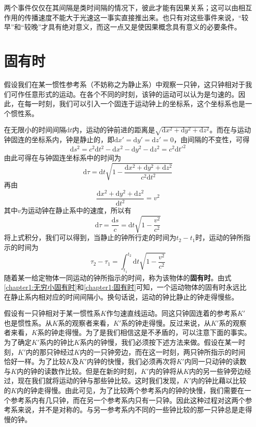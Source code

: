 两个事件仅仅在其间隔是类时间隔的情况下，彼此才能有因果关系；这可以由相互作用的传播速度不能大于光速这一事实直接推出来。也只有对这些事件来说，“较早”和“较晚”才具有绝对意义，而这一点又是使因果概念具有意义的必要条件。

\section{固有时}\label{chapter1:section固有时}

假设我们在某一惯性参考系（不妨称之为静止系）中观察一只钟，这只钟相对于我们可作任意形式的运动。在各个不同的时刻，该钟的运动可以认为是匀速的。因此，在每一时刻，我们可以引入一个固连于运动钟上的坐标系，这个坐标系也是一个惯性系。

在无限小的时间间隔$\mathrm{d}t$内，运动的钟前进的距离是$\sqrt{\mathrm{d}x^2 + \mathrm{d}y^2 + \mathrm{d}z^2}$。而在与运动钟固连的坐标系内，钟是静止的，即$\mathrm{d}x'= \mathrm{d}y' = \mathrm{d}z' = 0$，由间隔的不变性，可得
\begin{equation*}
	\mathrm{d}s^2 = c^2 \mathrm{d}t^2 - \mathrm{d}x^2 - \mathrm{d}y^2 - \mathrm{d}z^2 = c^2 \mathrm{d} t'^2
\end{equation*}
由此可得在与钟固连坐标系中的时间为
\begin{equation}
	\mathrm{d}\tau = \mathrm{d}t \sqrt{1-\frac{\mathrm{d}x^2 + \mathrm{d}y^2 + \mathrm{d}z^2}{c^2 \mathrm{d}t^2}}
	\label{chapter1:无穷小固有时}
\end{equation}
再由
\begin{equation*}
	\frac{\mathrm{d}x^2 + \mathrm{d}y^2 + \mathrm{d}z^2}{\mathrm{d}t^2} = v^2
\end{equation*}
其中$v$为运动钟在静止系中的速度，所以有
\begin{equation}
	\mathrm{d}\tau = \frac{\mathrm{d} s}{c} = \mathrm{d}t\sqrt{1-\frac{v^2}{c^2}}
	\label{chapter1:无穷小固有时}
\end{equation}
将上式积分，我们可以得到，当静止的钟所行走的时间为$t_2-t_1$时，运动的钟所指示的时间为
\begin{equation}
	\tau_2 - \tau_1 = \int_{t_1}^{t_2} \mathrm{d}t\sqrt{1-\frac{v^2}{c^2}}
	\label{chapter1:固有时}
\end{equation}
随着某一给定物体一同运动的钟所指示的时间，称为该物体的{\bf 固有时}。由式\eqref{chapter1:无穷小固有时}和\eqref{chapter1:固有时}可知，一个运动物体的固有时永远比在静止系内相对应的时间间隔小。换句话说，运动的钟比静止的钟走得慢些。

假设有一只钟相对于某一惯性系$K$作匀速直线运动。同这只钟固连着的参考系$K'$也是惯性系。从$K$系的观察者来看，$K'$系的钟走得慢。反过来说，从$K'$系的观察者来看，$K$系的钟走得慢。为了是我们相信这是不矛盾的，可以注意下面的事实。为了确定$K'$系内的钟比$K$系内的钟慢，我们必须按下述方法来做。假设在某一时刻，$K'$内的那只钟经过$K$内的一只钟旁边，而在这一时刻，两只钟所指示的时间恰好一样。为了比较$K$及$K'$内钟的快慢，我们必须再次将$K'$内同一只动钟的读数与$K$内的钟的读数作比较。但是在新的时刻，$K'$内的钟将从$K$内的另一些钟旁边经过，现在我们就将运动的钟与那些钟比较。这时我们发现，$K'$内的钟比藉以比较的$K$内的钟走得慢。由此可见，为了比较两个参考系内的钟的快慢，我们需要在一个参考系内有几只钟，而在另一个参考系内只有一只钟。因此这种过程对这两个参考系来说，并不是对称的。与另一参考系内不同的一些钟比较的那一只钟总是走得慢的钟。

